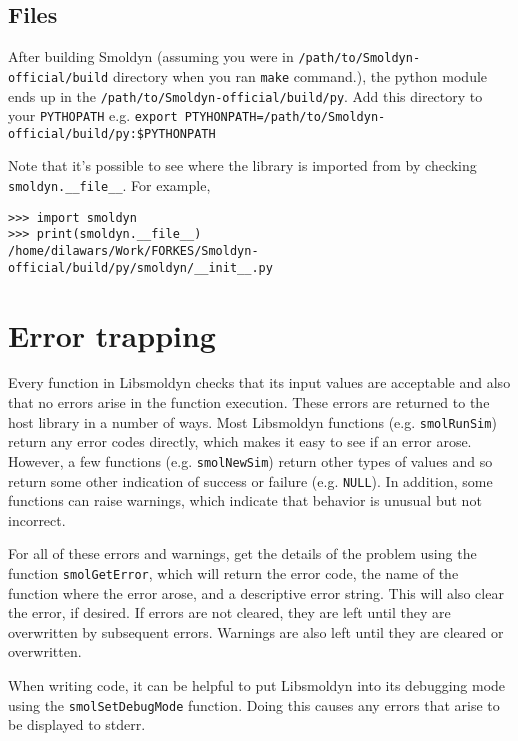 \documentclass {book}
\begin{document}
\section{Files}

After building Smoldyn (assuming you were in
\texttt{/path/to/Smoldyn-official/build} directory when you ran \verb|make|
command.), the python module ends up in the
\texttt{/path/to/Smoldyn-official/build/py}.  Add this directory to your
\texttt{PYTHOPATH} e.g. 
\verb|export PTYHONPATH=/path/to/Smoldyn-official/build/py:$PYTHONPATH|

Note that it's possible to see where the library is imported from by checking
\verb|smoldyn.__file__|. For example,

\begin{verbatim}
>>> import smoldyn
>>> print(smoldyn.__file__)
/home/dilawars/Work/FORKES/Smoldyn-official/build/py/smoldyn/__init__.py
\end{verbatim}

\chapter{Error trapping}

Every function in Libsmoldyn checks that its input values are acceptable and also that no errors arise in the function execution. These errors are returned to the host library in a number of ways. Most Libsmoldyn functions (e.g. \texttt{smolRunSim}) return any error codes directly, which makes it easy to see if an error arose. However, a few functions (e.g. \texttt{smolNewSim}) return other types of values and so return some other indication of success or failure (e.g. \texttt{NULL}). In addition, some functions can raise warnings, which indicate that behavior is unusual but not incorrect.

For all of these errors and warnings, get the details of the problem using the function \texttt{smolGetError}, which will return the error code, the name of the function where the error arose, and a descriptive error string. This will also clear the error, if desired. If errors are not cleared, they are left until they are overwritten by subsequent errors. Warnings are also left until they are cleared or overwritten.

When writing code, it can be helpful to put Libsmoldyn into its debugging mode using the \texttt{smolSetDebugMode} function. Doing this causes any errors that arise to be displayed to stderr.
\end{document}
